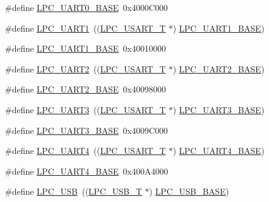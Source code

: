 \begin{DoxyCompactItemize}
\item 
\#define \hyperlink{group__PERIPH__177X__8X__BASE_gaa96fb70405a1298b350fc6f0ad0af997}{L\+P\+C\+\_\+\+U\+A\+R\+T0\+\_\+\+B\+A\+SE}~0x4000\+C000
\item 
\#define \hyperlink{group__PERIPH__177X__8X__BASE_ga83ea0dab4dcb7411c2e1de20050a4d2d}{L\+P\+C\+\_\+\+U\+A\+R\+T1}~((\hyperlink{structLPC__USART__T}{L\+P\+C\+\_\+\+U\+S\+A\+R\+T\+\_\+T}            $\ast$) \hyperlink{group__PERIPH__407X__8X__BASE_ga18e8f96b25e3f343bdd7ba552ae7a617}{L\+P\+C\+\_\+\+U\+A\+R\+T1\+\_\+\+B\+A\+SE})
\item 
\#define \hyperlink{group__PERIPH__177X__8X__BASE_ga18e8f96b25e3f343bdd7ba552ae7a617}{L\+P\+C\+\_\+\+U\+A\+R\+T1\+\_\+\+B\+A\+SE}~0x40010000
\item 
\#define \hyperlink{group__PERIPH__177X__8X__BASE_gac8badf231948fc9216d416c71a34e924}{L\+P\+C\+\_\+\+U\+A\+R\+T2}~((\hyperlink{structLPC__USART__T}{L\+P\+C\+\_\+\+U\+S\+A\+R\+T\+\_\+T}            $\ast$) \hyperlink{group__PERIPH__407X__8X__BASE_ga8c3873ab74db743465b038c74b365281}{L\+P\+C\+\_\+\+U\+A\+R\+T2\+\_\+\+B\+A\+SE})
\item 
\#define \hyperlink{group__PERIPH__177X__8X__BASE_ga8c3873ab74db743465b038c74b365281}{L\+P\+C\+\_\+\+U\+A\+R\+T2\+\_\+\+B\+A\+SE}~0x40098000
\item 
\#define \hyperlink{group__PERIPH__177X__8X__BASE_ga61c2bf57d66b50108cdec6878f9e8ee5}{L\+P\+C\+\_\+\+U\+A\+R\+T3}~((\hyperlink{structLPC__USART__T}{L\+P\+C\+\_\+\+U\+S\+A\+R\+T\+\_\+T}            $\ast$) \hyperlink{group__PERIPH__407X__8X__BASE_gac8dc517d5e03d4ca7666c18c89d5052e}{L\+P\+C\+\_\+\+U\+A\+R\+T3\+\_\+\+B\+A\+SE})
\item 
\#define \hyperlink{group__PERIPH__177X__8X__BASE_gac8dc517d5e03d4ca7666c18c89d5052e}{L\+P\+C\+\_\+\+U\+A\+R\+T3\+\_\+\+B\+A\+SE}~0x4009\+C000
\item 
\#define \hyperlink{group__PERIPH__177X__8X__BASE_gac023ca54f076d863ce21045365ebca63}{L\+P\+C\+\_\+\+U\+A\+R\+T4}~((\hyperlink{structLPC__USART__T}{L\+P\+C\+\_\+\+U\+S\+A\+R\+T\+\_\+T}            $\ast$) \hyperlink{group__PERIPH__407X__8X__BASE_ga52bf68ce53e20c93366ba5496e98f5c8}{L\+P\+C\+\_\+\+U\+A\+R\+T4\+\_\+\+B\+A\+SE})
\item 
\#define \hyperlink{group__PERIPH__177X__8X__BASE_ga52bf68ce53e20c93366ba5496e98f5c8}{L\+P\+C\+\_\+\+U\+A\+R\+T4\+\_\+\+B\+A\+SE}~0x400\+A4000
\item 
\#define \hyperlink{group__PERIPH__177X__8X__BASE_gae77538a7f3f4850715c95283e38b423f}{L\+P\+C\+\_\+\+U\+SB}~((\hyperlink{structLPC__USB__T}{L\+P\+C\+\_\+\+U\+S\+B\+\_\+T}              $\ast$) \hyperlink{group__PERIPH__407X__8X__BASE_gaa619008881e9f76dc31131313eff1b79}{L\+P\+C\+\_\+\+U\+S\+B\+\_\+\+B\+A\+SE})

\end{DoxyCompactItemize}
